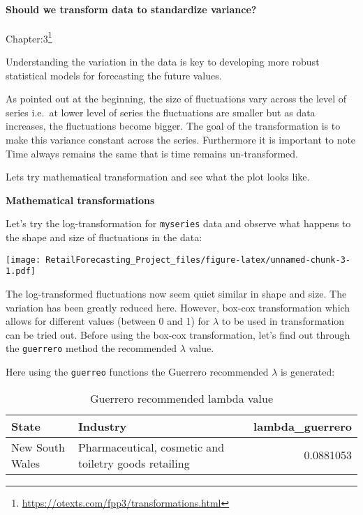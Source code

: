 \documentclass[
]{article}
\begin{document}
\hypertarget{should-we-transform-data-to-standardize-variance}{%
\paragraph{Should we transform data to standardize
variance?}\label{should-we-transform-data-to-standardize-variance}}

Chapter:3\footnote{\url{https://otexts.com/fpp3/transformations.html}}

Understanding the variation in the data is key to developing more robust
statistical models for forecasting the future values.

As pointed out at the beginning, the size of fluctuations vary across
the level of series i.e.~at lower level of series the fluctuations are
smaller but as data increases, the fluctuations become bigger. The goal
of the transformation is to make this variance constant across the
series. Furthermore it is important to note Time always remains the same
that is time remains un-transformed.

Lets try mathematical transformation and see what the plot looks like.

\textbf{Mathematical transformations}

Let's try the log-transformation for \texttt{myseries} data and observe
what happens to the shape and size of fluctuations in the data:

\texttt{[image: RetailForecasting\_Project\_files/figure-latex/unnamed-chunk-3-1.pdf]}

The log-transformed fluctuations now seem quiet similar in shape and
size. The variation has been greatly reduced here. However, box-cox
transformation which allows for different values (between 0 and 1) for
\(\lambda\) to be used in transformation can be tried out. Before using
the box-cox transformation, let's find out through the \texttt{guerrero}
method the recommended \(\lambda\) value.

Here using the \texttt{guerreo} functions the Guerrero recommended
\(\lambda\) is generated:

\begin{table}

\caption{\label{tab:guerrero}Guerrero recommended lambda value}
\centering
\begin{tabular}[t]{l|l|r}
\hline
State & Industry & lambda\_guerrero\\
\hline
New South Wales & Pharmaceutical, cosmetic and toiletry goods retailing & 0.0881053\\
\hline
\end{tabular}
\end{table}
\end{document}
